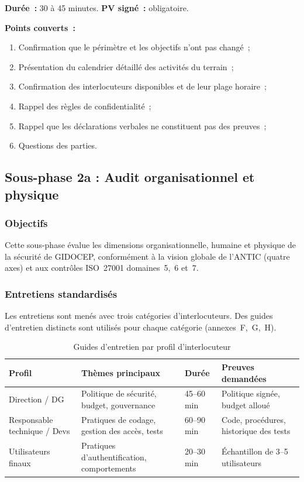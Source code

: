 \documentclass[12pt,a4paper,oneside]{report}
\begin{document}
\textbf{Dur\'ee~:} 30 \`a 45 minutes. \textbf{PV sign\'e~:} obligatoire.

\textbf{Points couverts~:}
\begin{enumerate}[leftmargin=*, itemsep=2pt]
\item Confirmation que le p\'erim\`etre et les objectifs n'ont pas chang\'e~;
\item Pr\'esentation du calendrier d\'etaill\'e des activit\'es du terrain~;
\item Confirmation des interlocuteurs disponibles et de leur plage horaire~;
\item Rappel des r\`egles de confidentialit\'e~;
\item Rappel que les d\'eclarations verbales ne constituent pas des preuves~;
\item Questions des parties.
\end{enumerate}

\subsection{Sous-phase 2a : Audit organisationnel et physique}

\subsubsection{Objectifs}

Cette sous-phase \'evalue les dimensions organisationnelle, humaine et physique
de la s\'ecurit\'e de GIDOCEP, conform\'ement \`a la vision globale de l'ANTIC
(quatre axes) et aux contr\^oles ISO~27001 domaines~5,~6 et~7.

\subsubsection{Entretiens standardis\'es}

Les entretiens sont men\'es avec trois cat\'egories d'interlocuteurs. Des
guides d'entretien distincts sont utilis\'es pour chaque cat\'egorie (annexes~F,~G,~H).

\begin{table}[H]
\centering\small
\caption{Guides d'entretien par profil d'interlocuteur}
\label{tab:guides_entretien}
\begin{tabularx}{\textwidth}{p{3cm}p{3cm}p{3cm}X}
\toprule
\rowcolor{theadcolor}
\color{white}\textbf{Profil} &
\color{white}\textbf{Th\`emes principaux} &
\color{white}\textbf{Dur\'ee} &
\color{white}\textbf{Preuves demand\'ees} \\
\midrule
Direction / DG & Politique de s\'ecurit\'e, budget, gouvernance &
  45--60 min & Politique sign\'ee, budget allou\'e \\
Responsable technique / Devs & Pratiques de codage, gestion des acc\`es, tests &
  60--90 min & Code, procédures, historique des tests \\
Utilisateurs finaux & Pratiques d'authentification, comportements &
  20--30 min & \'Echantillon de 3--5 utilisateurs \\
\bottomrule
\end{tabularx}
\end{table}
\end{document}
